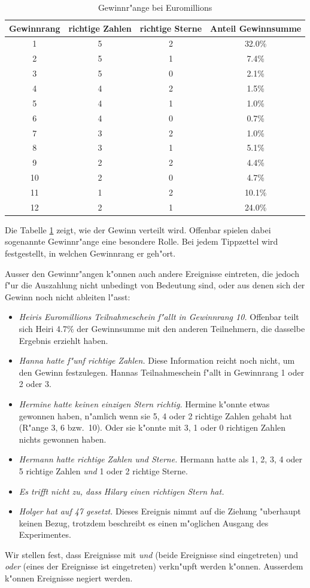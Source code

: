 \begin{table}
\begin{center}
\begin{tabular}{|c|c|c|c|}
\hline
Gewinnrang&richtige Zahlen&richtige Sterne&Anteil Gewinnsumme\\
\hline
1&5&2&32.0\%\\
2&5&1&7.4\%\\
3&5&0&2.1\%\\
4&4&2&1.5\%\\
5&4&1&1.0\%\\
6&4&0&0.7\%\\
7&3&2&1.0\%\\
8&3&1&5.1\%\\
9&2&2&4.4\%\\
10&2&0&4.7\%\\
11&1&2&10.1\%\\
12&2&1&24.0\%\\
\hline
\end{tabular}
\end{center}
\caption{Gewinnr"ange bei Euromillions\label{gewinnraenge}}
\end{table}

Die Tabelle \ref{gewinnraenge} zeigt, wie der Gewinn verteilt wird.
Offenbar spielen dabei sogenannte Gewinnr"ange eine besondere Rolle.
Bei jedem Tippzettel wird festgestellt, in welchen Gewinnrang er
geh"ort.

Ausser den Gewinnr"angen k"onnen auch andere Ereignisse eintreten,
die jedoch f"ur die Auszahlung nicht unbedingt von Bedeutung sind,
oder aus denen sich der Gewinn noch nicht ableiten l"asst:
\begin{itemize}
\item {\it Heiris Euromillions Teilnahmeschein f"allt in Gewinnrang 10.} Offenbar
teilt sich Heiri 4.7\% der Gewinnsumme mit den anderen Teilnehmern, die
dasselbe Ergebnis erziehlt haben.
\item {\it Hanna hatte f"unf richtige Zahlen.} Diese Information reicht noch
nicht, um den Gewinn festzulegen. Hannas Teilnahmeschein f"allt in
Gewinnrang 1 oder 2 oder 3.
\item {\it Hermine hatte keinen einzigen Stern richtig.} Hermine k"onnte
etwas gewonnen haben, n"amlich wenn sie 5, 4 oder 2 richtige Zahlen
gehabt hat (R"ange 3, 6 bzw.~10). Oder sie k"onnte mit 3, 1 oder 0
richtigen Zahlen nichts gewonnen haben.
\item {\it Hermann hatte richtige Zahlen und Sterne.} Hermann hatte
als 1, 2, 3, 4 oder 5 richtige Zahlen {\em und}
1 oder 2 richtige
Sterne.
\item {\it Es trifft nicht zu, dass Hilary einen richtigen Stern hat.}
\item {\it Holger hat auf 47 gesetzt.}
Dieses Ereignis nimmt auf die Ziehung "uberhaupt keinen Bezug,
trotzdem beschreibt es einen m"oglichen Ausgang des Experimentes.
\end{itemize}
Wir stellen fest, dass Ereignisse mit {\em und} (beide Ereignisse sind
eingetreten) und {\em oder} (eines der Ereignisse ist
eingetreten) verkn"upft werden k"onnen. Ausserdem k"onnen 
Ereignisse negiert werden.

